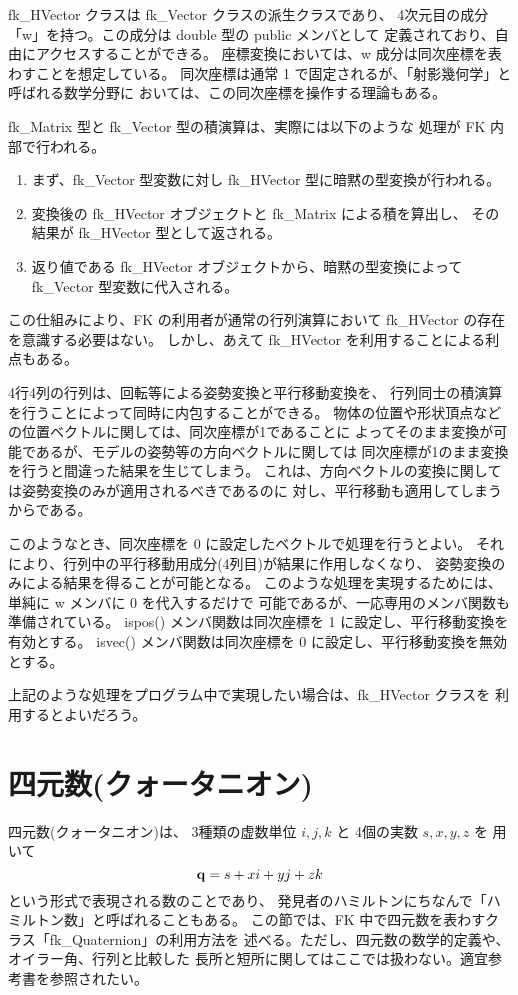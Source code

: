 fk\_HVector クラスは fk\_Vector クラスの派生クラスであり、
4次元目の成分「w」を持つ。この成分は double 型の public メンバとして
定義されており、自由にアクセスすることができる。
座標変換においては、w 成分は同次座標を表わすことを想定している。
同次座標は通常 1 で固定されるが、「射影幾何学」と呼ばれる数学分野に
おいては、この同次座標を操作する理論もある。

fk\_Matrix 型と fk\_Vector 型の積演算は、実際には以下のような
処理が FK 内部で行われる。
\begin{enumerate}
 \item まず、fk\_Vector 型変数に対し fk\_HVector 型に暗黙の型変換が行われる。
 \item 変換後の fk\_HVector オブジェクトと fk\_Matrix による積を算出し、
	その結果が fk\_HVector 型として返される。
 \item 返り値である fk\_HVector オブジェクトから、暗黙の型変換によって
	fk\_Vector 型変数に代入される。
\end{enumerate}
この仕組みにより、FK の利用者が通常の行列演算において
fk\_HVector の存在を意識する必要はない。
しかし、あえて fk\_HVector を利用することによる利点もある。

4行4列の行列は、回転等による姿勢変換と平行移動変換を、
行列同士の積演算を行うことによって同時に内包することができる。
物体の位置や形状頂点などの位置ベクトルに関しては、同次座標が1であることに
よってそのまま変換が可能であるが、モデルの姿勢等の方向ベクトルに関しては
同次座標が1のまま変換を行うと間違った結果を生じてしまう。
これは、方向ベクトルの変換に関しては姿勢変換のみが適用されるべきであるのに
対し、平行移動も適用してしまうからである。

このようなとき、同次座標を 0 に設定したベクトルで処理を行うとよい。
それにより、行列中の平行移動用成分(4列目)が結果に作用しなくなり、
姿勢変換のみによる結果を得ることが可能となる。
このような処理を実現するためには、単純に w メンバに 0 を代入するだけで
可能であるが、一応専用のメンバ関数も準備されている。
ispos() メンバ関数は同次座標を 1 に設定し、平行移動変換を有効とする。
isvec() メンバ関数は同次座標を 0 に設定し、平行移動変換を無効とする。

上記のような処理をプログラム中で実現したい場合は、fk\_HVector クラスを
利用するとよいだろう。

\section{四元数(クォータニオン)}
四元数(クォータニオン)は、
3種類の虚数単位 \(i, j, k\) と
4個の実数 \(s, x, y, z\) を
用いて
\[
	\mathbf{q} = s + xi + yj + zk
\]
という形式で表現される数のことであり、
発見者のハミルトンにちなんで「ハミルトン数」と呼ばれることもある。
この節では、FK 中で四元数を表わすクラス「fk\_Quaternion」の利用方法を
述べる。ただし、四元数の数学的定義や、オイラー角、行列と比較した
長所と短所に関してはここでは扱わない。適宜参考書を参照されたい。

